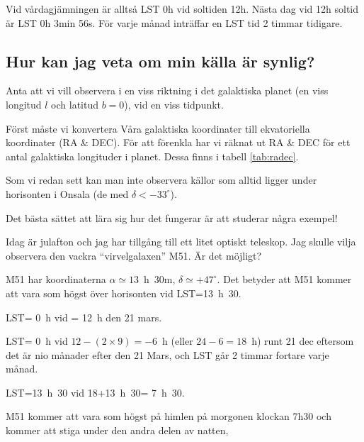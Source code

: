 Vid vårdagjämningen är alltså LST 0h vid soltiden 12h. Nästa dag vid
12h soltid är LST 0h 3min 56s. För varje månad inträffar en LST tid 2
timmar tidigare.

\subsection{Hur kan jag veta om min källa är synlig?}
\label{app:visiblecoords}

Anta att vi vill observera i en viss riktning i det galaktiska planet
(en viss longitud $l$ och latitud $b=0$), vid en viss tidpunkt.

Först måste vi konvertera Våra galaktiska koordinater till
ekvatoriella koordinater (RA \& DEC). För att förenkla har vi räknat
ut RA \& DEC för ett antal galaktiska longituder i planet. Dessa finns i tabell \ref{tab:radec}. 

Som vi redan sett kan man inte observera källor som alltid ligger under
horisonten i Onsala (de med $\delta < -33^\circ$).

Det bästa sättet att lära sig hur det fungerar är att studerar några exempel!

 Idag är julafton och jag har tillgång till
ett litet optiskt teleskop. Jag skulle vilja observera den vackra
``virvelgalaxen'' M51. Är det möjligt? 

\smallskip M51 har koordinaterna $\alpha\simeq13$~h~30m,
$\delta\simeq+47^\circ$. Det betyder att M51 kommer att vara som högst
över horisonten vid LST=13~h~30.

LST= 0~h vid = 12~h den 21 mars.

LST= 0~h vid $12-(2\times 9) = -6$~h (eller $24-6=18$~h) runt 21 dec
eftersom det är nio månader efter den 21 Mars, och LST går 2 timmar
fortare varje månad.

LST=13~h~30 vid 18+13~h~30= 7~h~30.

M51 kommer att vara som högst på himlen på morgonen klockan 7h30 och
kommer att stiga under den andra delen av natten,

